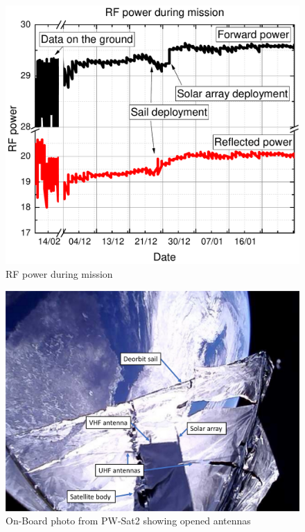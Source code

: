\begin{figure}[H]
    \centering
    \includegraphics[width=0.6\paperwidth]{img/6/rf_power_comm.pdf}
    \caption{RF power during mission}
    \label{4_rf_power_comm}
\end{figure}

\begin{figure}
    \centering
    \includegraphics[width=0.7\paperwidth]{img/6/antennas_deployed_orbit.jpg}
    \caption{On-Board photo from PW-Sat2 showing opened antennas}
    \label{antennas_deployed_orbit}
\end{figure}



